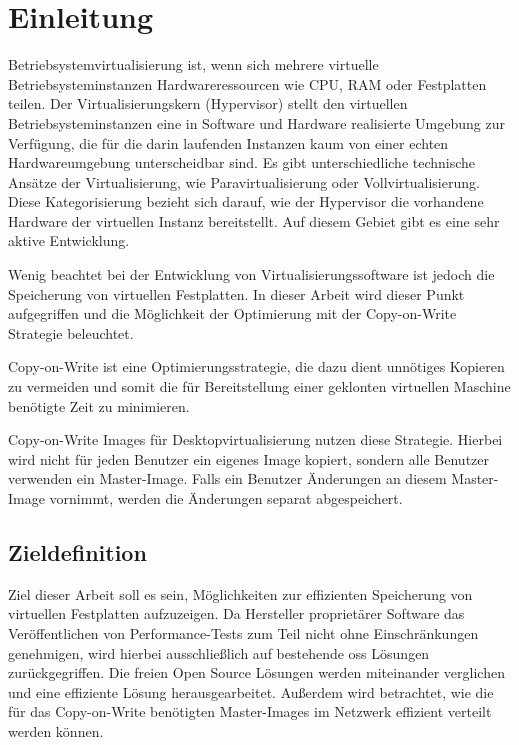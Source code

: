 \chapter{Einleitung}

Betriebsystemvirtualisierung ist, wenn sich mehrere virtuelle Betriebsysteminstanzen Hardwareressourcen wie CPU, RAM oder Festplatten teilen. Der Virtualisierungskern (Hypervisor) stellt den virtuellen Betriebsysteminstanzen eine in Software und Hardware realisierte Umgebung zur Verfügung, die für die darin laufenden Instanzen kaum von einer echten Hardwareumgebung unterscheidbar sind. Es gibt unterschiedliche technische Ansätze der Virtualisierung, wie Paravirtualisierung oder Vollvirtualisierung. Diese Kategorisierung bezieht sich darauf, wie der Hypervisor die vorhandene Hardware der virtuellen Instanz bereitstellt. Auf diesem Gebiet gibt es eine sehr aktive Entwicklung. \cite{andrep} \cite{baun}

Wenig beachtet bei der Entwicklung von Virtualisierungssoftware ist jedoch die Speicherung von virtuellen Festplatten. In dieser Arbeit wird dieser Punkt aufgegriffen und die Möglichkeit der Optimierung mit der Copy-on-Write Strategie beleuchtet.

Copy-on-Write ist eine Optimierungsstrategie, die dazu dient unnötiges Kopieren zu vermeiden und somit die für Bereitstellung einer geklonten virtuellen Maschine benötigte Zeit zu minimieren.
\begin{comment}Zusätzlich werden die Systemressourcen (Storage, IO, CPU) des physikalischen Virtualisierungsservers geschont.\end{comment} 
Copy-on-Write Images für Desktopvirtualisierung nutzen diese Strategie. Hierbei wird nicht für jeden Benutzer ein eigenes Image kopiert, sondern alle Benutzer verwenden ein Master-Image. Falls ein Benutzer Änderungen an diesem Master-Image vornimmt, werden die Änderungen separat abgespeichert. 

\section{Zieldefinition}
Ziel dieser Arbeit soll es sein, Möglichkeiten zur effizienten Speicherung von virtuellen Festplatten aufzuzeigen. Da Hersteller proprietärer Software das Veröffentlichen von Performance-Tests zum Teil nicht ohne Einschränkungen genehmigen, wird hierbei ausschließlich auf bestehende \gls{oss} Lösungen zurückgegriffen. Die freien Open Source Lösungen werden miteinander verglichen und eine effiziente Lösung herausgearbeitet. Außerdem wird betrachtet, wie die für das Copy-on-Write benötigten Master-Images im Netzwerk effizient verteilt werden können.  \cite{vmware}

